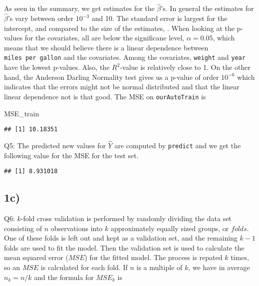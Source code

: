 \documentclass[]{article}
\newenvironment{Shaded}{\begin{snugshade}}{\end{snugshade}}
\newcommand{\KeywordTok}[1]{\textcolor[rgb]{0.13,0.29,0.53}{\textbf{#1}}}
\newcommand{\DecValTok}[1]{\textcolor[rgb]{0.00,0.00,0.81}{#1}}
\newcommand{\OperatorTok}[1]{\textcolor[rgb]{0.81,0.36,0.00}{\textbf{#1}}}
\newcommand{\NormalTok}[1]{#1}
\begin{document}
As seen in the summary, we get estimates for the \(\hat\beta\)'s. In
general the estimates for \(\hat\beta\)'s vary between order \(10^{-3}\)
and 10. The standard error is largest for the intercept, and compared to
the size of the estimates, . When looking at the p-values for the
covariates, all are below the significane level, \(\alpha=0.05\), which
means that we should believe there is a linear dependence between
\texttt{miles\ per\ gallon} and the covariates. Among the covariates,
\texttt{weight} and \texttt{year} have the lowest p-values. Also, the
\(R^2\)-value is relatively close to 1. On the other hand, the Anderson
Darling Normality test gives us a p-value of order \(10^{-6}\) which
indicates that the errors might not be normal distributed and that the
linear linear dependence not is that good. The MSE on
\texttt{ourAutoTrain} is

\begin{Shaded}
\begin{Highlighting}[]
\NormalTok{MSE_train}
\end{Highlighting}
\end{Shaded}

\begin{verbatim}
## [1] 10.18351
\end{verbatim}

Q5: The predicted new values for \(\hat Y\) are computed by
\texttt{predict} and we get the following value for the MSE for the test
set.

\begin{Shaded}
\end{Shaded}

\begin{verbatim}
## [1] 8.931018
\end{verbatim}

\subsection{1c)}\label{c}

Q6: \(k\)-fold cross validation is performed by randomly dividing the
data set consisting of \(n\) observations into \(k\) approximately
equally sized groups, or \(folds\). One of these folds is left out and
kept as a validation set, and the remaining \(k-1\) folds are used to
fit the model. Then the validation set is used to calculate the mean
squared error (\(MSE\)) for the fitted model. The process is repated
\(k\) times, so an \(MSE\) is calculated for each fold. If \(n\) is a
multiple of \(k\), we have in average \(n_k=n/k\) and the formula for
\(MSE_k\) is
\end{document}

